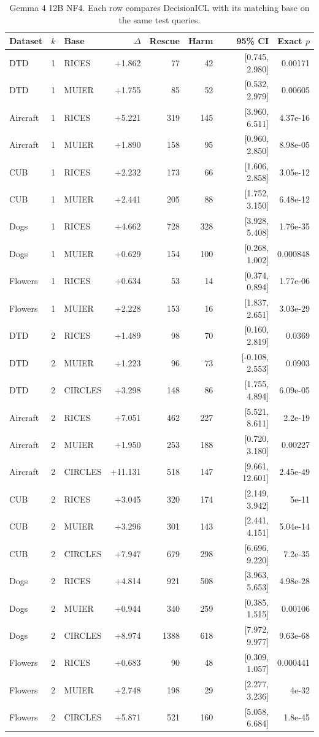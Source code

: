 \documentclass[10pt,twocolumn,letterpaper]{article}
\newcommand{\method}{DecisionICL\xspace}
\begin{document}
\begin{table}[t]
\caption{Gemma 4 12B NF4. Each row compares \method with its matching base on the same test queries.}
\label{sup:paired_2}
\centering\small
\begin{tabular}{lllrrrrr}
\toprule
Dataset & $k$ & Base & $\Delta$ & Rescue & Harm & 95\% CI & Exact $p$ \\
\midrule
DTD & 1 & RICES & +1.862 & 77 & 42 & [0.745, 2.980] & 0.00171 \\
DTD & 1 & MUIER & +1.755 & 85 & 52 & [0.532, 2.979] & 0.00605 \\
Aircraft & 1 & RICES & +5.221 & 319 & 145 & [3.960, 6.511] & 4.37e-16 \\
Aircraft & 1 & MUIER & +1.890 & 158 & 95 & [0.960, 2.850] & 8.98e-05 \\
CUB & 1 & RICES & +2.232 & 173 & 66 & [1.606, 2.858] & 3.05e-12 \\
CUB & 1 & MUIER & +2.441 & 205 & 88 & [1.752, 3.150] & 6.48e-12 \\
Dogs & 1 & RICES & +4.662 & 728 & 328 & [3.928, 5.408] & 1.76e-35 \\
Dogs & 1 & MUIER & +0.629 & 154 & 100 & [0.268, 1.002] & 0.000848 \\
Flowers & 1 & RICES & +0.634 & 53 & 14 & [0.374, 0.894] & 1.77e-06 \\
Flowers & 1 & MUIER & +2.228 & 153 & 16 & [1.837, 2.651] & 3.03e-29 \\
DTD & 2 & RICES & +1.489 & 98 & 70 & [0.160, 2.819] & 0.0369 \\
DTD & 2 & MUIER & +1.223 & 96 & 73 & [-0.108, 2.553] & 0.0903 \\
DTD & 2 & CIRCLES & +3.298 & 148 & 86 & [1.755, 4.894] & 6.09e-05 \\
Aircraft & 2 & RICES & +7.051 & 462 & 227 & [5.521, 8.611] & 2.2e-19 \\
Aircraft & 2 & MUIER & +1.950 & 253 & 188 & [0.720, 3.180] & 0.00227 \\
Aircraft & 2 & CIRCLES & +11.131 & 518 & 147 & [9.661, 12.601] & 2.45e-49 \\
CUB & 2 & RICES & +3.045 & 320 & 174 & [2.149, 3.942] & 5e-11 \\
CUB & 2 & MUIER & +3.296 & 301 & 143 & [2.441, 4.151] & 5.04e-14 \\
CUB & 2 & CIRCLES & +7.947 & 679 & 298 & [6.696, 9.220] & 7.2e-35 \\
Dogs & 2 & RICES & +4.814 & 921 & 508 & [3.963, 5.653] & 4.98e-28 \\
Dogs & 2 & MUIER & +0.944 & 340 & 259 & [0.385, 1.515] & 0.00106 \\
Dogs & 2 & CIRCLES & +8.974 & 1388 & 618 & [7.972, 9.977] & 9.63e-68 \\
Flowers & 2 & RICES & +0.683 & 90 & 48 & [0.309, 1.057] & 0.000441 \\
Flowers & 2 & MUIER & +2.748 & 198 & 29 & [2.277, 3.236] & 4e-32 \\
Flowers & 2 & CIRCLES & +5.871 & 521 & 160 & [5.058, 6.684] & 1.8e-45 \\
\bottomrule
\end{tabular}
\end{table}
\end{document}
